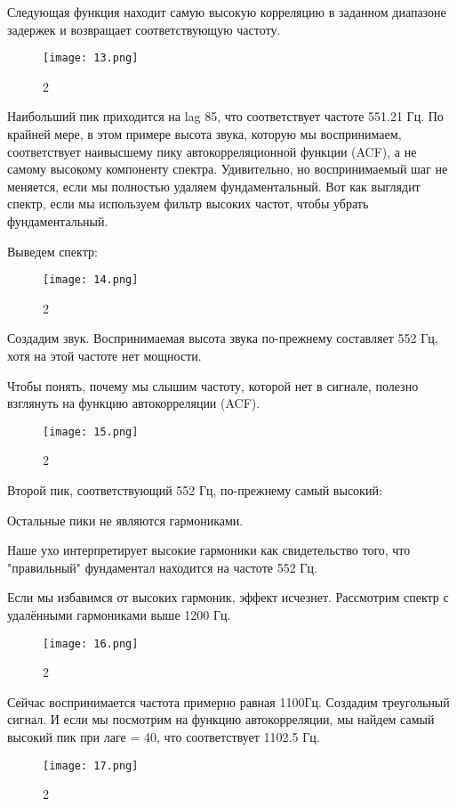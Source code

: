 \documentclass[10pt,a4paper,oneside]{article}
\begin{document}
Следующая функция находит самую высокую корреляцию в заданном диапазоне задержек и возвращает соответствующую частоту.

\begin{figure}[H]
        \centering
        \texttt{[image: 13.png]}
        \caption{2}
        \label{fig:first}
\end{figure}

Наибольший пик приходится на lag 85, что соответствует частоте 551.21 Гц. По крайней мере, в этом примере высота звука, которую мы воспринимаем, соответствует наивысшему пику автокорреляционной функции (ACF), а не самому высокому компоненту спектра. Удивительно, но воспринимаемый шаг не меняется, если мы полностью удаляем фундаментальный. Вот как выглядит спектр, если мы используем фильтр высоких частот, чтобы убрать фундаментальный.

Выведем спектр: 

\begin{figure}[H]
        \centering
        \texttt{[image: 14.png]}
        \caption{2}
        \label{fig:first}
\end{figure}

Создадим звук. Воспринимаемая высота звука по-прежнему составляет 552 Гц, хотя на этой частоте нет мощности.

Чтобы понять, почему мы слышим частоту, которой нет в сигнале, полезно взглянуть на функцию автокорреляции (ACF).

\begin{figure}[H]
        \centering
        \texttt{[image: 15.png]}
        \caption{2}
        \label{fig:first}
\end{figure}

Второй пик, соответствующий 552 Гц, по-прежнему самый высокий:

Остальные пики не являются гармониками.

Наше ухо интерпретирует высокие гармоники как свидетельство того, что "правильный" фундаментал находится на частоте 552 Гц.

Если мы избавимся от высоких гармоник, эффект исчезнет. Рассмотрим спектр с удалёнными гармониками выше 1200 Гц.

\begin{figure}[H]
        \centering
        \texttt{[image: 16.png]}
        \caption{2}
        \label{fig:first}
\end{figure}

Сейчас воспринимается частота примерно равная 1100Гц. Создадим треугольный сигнал. И если мы посмотрим на функцию автокорреляции, мы найдем самый высокий пик при лаге = 40, что соответствует 1102.5 Гц.

\begin{figure}[H]
        \centering
        \texttt{[image: 17.png]}
        \caption{2}
        \label{fig:first}
\end{figure}
\end{document}
